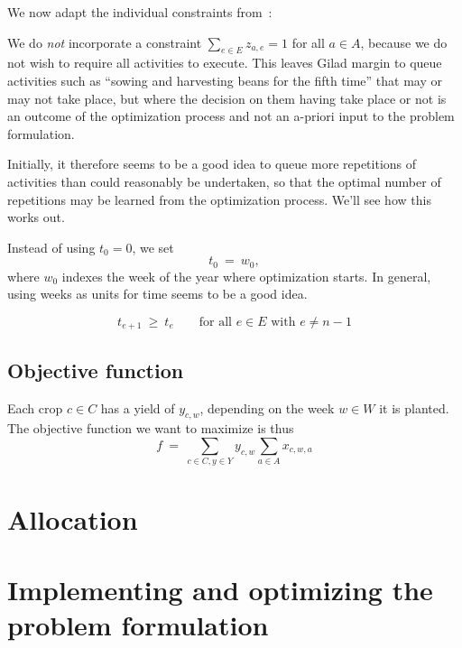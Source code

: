 \documentclass[11pt]{amsart}
\numberwithin{equation}{section}
\begin{document}
We now adapt the individual constraints from~\cite{artigues-etal11}:

\renewcommand{\arraystretch}{3}
\begin{description}

\item[Not all activities have to execute] We do \emph{not} incorporate a constraint
  $\sum_{e\in E} z_{a,e}=1$ for all $a\in A$, because we do not wish to require all
  activities to execute. This leaves Gilad margin to queue activities such as ``sowing and
  harvesting beans for the fifth time'' that may or may not take place, but where the
  decision on them having take place or not is an outcome of the optimization process and
  not an a-priori input to the problem formulation.

  Initially, it therefore seems to be a good idea to queue more repetitions of activities
  than could reasonably be undertaken, so that the optimal number of repetitions may be
  learned from the optimization process. We'll see how this works out.

\item[Setting the starting time] Instead of using $t_0=0$, we set
  \[
     t_0
     \ = \
     w_0,
  \]
  where $w_0$ indexes the week of the year where optimization starts. In general, using
  weeks as units for time seems to be a good idea.

\item[Ordering the execution starts]
  \[
     t_{e+1} 
     \ \ge \
     t_e
     \qquad\text{for all }
      e\in E\text{ with }
      e\ne n-1
  \]

\item 
\end{description}

\subsection{Objective function}

Each crop $c\in C$ has a yield of  $y_{c,w}$, depending on the week
$w\in W$ it is planted. 
The objective function we want to  maximize is thus
\[
   f 
   \ = \
   \sum_{c\in C, y\in Y} y_{c,w} \sum_{a\in A} x_{c,w,a}
\]


\section{Allocation}


\section{Implementing and optimizing the problem formulation}
\end{document}
